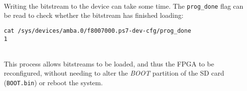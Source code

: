 ~\\
\noindent
Writing the bitstream to the device can take some time. The \texttt{prog\_done} flag can be read to check whether the bitstream has finished loading: \\

\begin{lstlisting}[style=text]
cat /sys/devices/amba.0/f8007000.ps7-dev-cfg/prog_done
1
\end{lstlisting}


~\\
\noindent
This process allows bitstreams to be loaded, and thus the FPGA to be reconfigured, without needing to alter the \textit{BOOT} partition of the SD card (\ie \texttt{BOOT.bin}) or reboot the system. 



